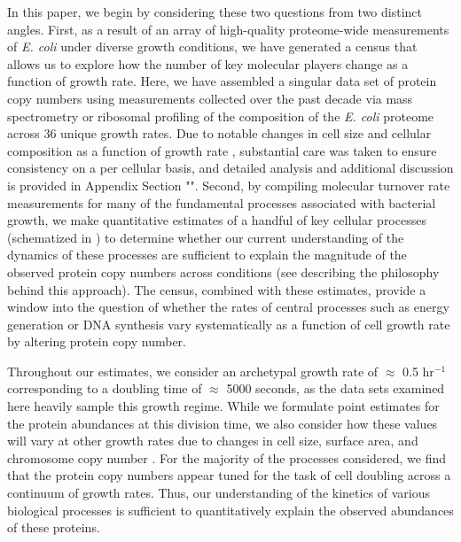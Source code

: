 
In this paper, we begin by considering these two questions from two distinct
angles. First, as a result of an array of high-quality proteome-wide
measurements of \textit{E. coli} under diverse growth conditions, we have
generated a census that allows us to explore how the number of key molecular
players change as a function of growth rate. Here, we have assembled a singular
data set of protein copy numbers using measurements collected over the past
decade via mass spectrometry \citep{schmidt2016, peebo2015, valgepea2013} or
ribosomal profiling \citep{li2014} of the composition of the \textit{E. coli}
proteome across 36 unique growth rates. Due to notable changes in cell size and
cellular composition as a function of growth rate \citep{bremer2008,
taheriaraghi2015}, substantial care was taken to ensure consistency on a per
cellular basis, and detailed analysis and additional discussion is provided in
Appendix Section "". Second, by compiling molecular
turnover rate measurements for many of the fundamental processes associated with
bacterial growth, we make quantitative estimates of a handful of key cellular
processes (schematized in ) to determine whether our current
understanding of the dynamics of these processes are sufficient to explain the
magnitude of the observed protein copy numbers across conditions (see
 describing the philosophy behind this approach). The
census, combined with these estimates, provide a window into the question of
whether the rates of central processes such as energy generation or DNA
synthesis vary systematically as a function of cell growth rate by altering
protein copy number.

Throughout our estimates, we consider an archetypal growth rate of $\approx$
0.5 hr$^{-1}$ corresponding to a doubling time of $\approx$ 5000 seconds, as
the data sets examined here heavily sample this growth regime. While we
formulate point estimates for the protein abundances at this division time,
we also consider how these values will vary at other growth rates due to
changes in cell size, surface area, and chromosome copy number
\citep{taheriaraghi2015, harris2018}. For the majority of the processes
considered, we find that the protein copy numbers appear tuned for the task
of cell doubling across a continuum of growth rates. Thus, our understanding
of the kinetics of various biological processes is sufficient to
quantitatively explain the observed abundances of these proteins.

